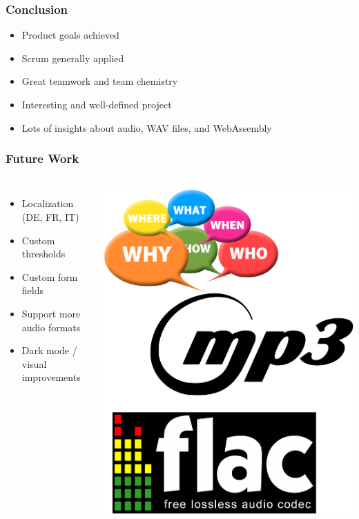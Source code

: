 \begin{frame}
    \frametitle{Conclusion}
    \begin{itemize}
        \large
        \item Product goals achieved
        \item Scrum generally applied
        \item Great teamwork and team chemistry
        \item Interesting and well-defined project
        \item Lots of insights about audio, WAV files, and WebAssembly
    \end{itemize}
\end{frame}

\begin{frame}
    \frametitle{Future Work}
    \begin{columns}
    \begin{itemize}
        \large
        \item Localization (DE, FR, IT)
        \item Custom thresholds
        \item Custom form fields
        \item Support more audio formats
        \item Dark mode / visual improvements
    \end{itemize}
    \centering
    \includegraphics[width=0.7\linewidth]{../assets/future_work.png}
\end{columns}
\end{frame}

